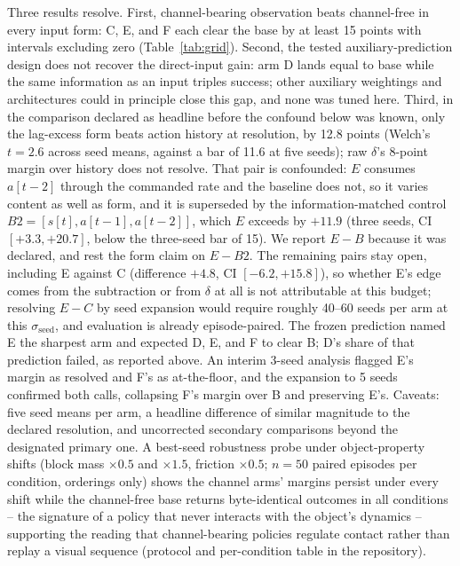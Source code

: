 \documentclass{article}
\begin{document}
Three results resolve. First, channel-bearing observation beats
channel-free in every input form: C, E, and F each clear the base by at
least 15 points with intervals excluding zero (Table~\ref{tab:grid}).
Second, the tested auxiliary-prediction design does not recover the
direct-input gain: arm D lands equal to base while the same information
as an input triples success; other auxiliary weightings and architectures
could in principle close this gap, and none was tuned here. Third, in the
comparison declared as headline before the confound below was known, only
the lag-excess form beats action history at resolution, by 12.8 points
(Welch's $t = 2.6$ across seed means, against a bar of 11.6 at five
seeds); raw $\delta$'s 8-point margin over history does not resolve. That
pair is confounded: $E$ consumes $a[t{-}2]$ through the commanded rate and
the baseline does not, so it varies content as well as form, and it is
superseded by the information-matched control $B2 = [s[t], a[t{-}1],
a[t{-}2]]$, which $E$ exceeds by $+11.9$ (three seeds, CI $[+3.3,
+20.7]$, below the three-seed bar of 15). We report $E{-}B$ because it was
declared, and rest the form claim on $E{-}B2$. The
remaining pairs stay open, including E against C (difference $+4.8$, CI
$[-6.2, +15.8]$), so whether E's edge comes from the subtraction or from
$\delta$ at all is not attributable at this budget;
resolving $E{-}C$ by seed expansion would require roughly 40--60 seeds
per arm at this $\sigma_{\text{seed}}$, and evaluation is already
episode-paired. The frozen prediction named E the sharpest arm and
expected D, E, and F to clear B; D's share of that prediction failed, as
reported above. An interim 3-seed analysis flagged E's margin as resolved
and F's as at-the-floor, and the expansion to 5 seeds confirmed both
calls, collapsing F's margin over B and preserving E's. Caveats: five seed means per arm, a
headline difference of similar magnitude to the declared resolution, and
uncorrected secondary comparisons beyond the designated primary one.
A best-seed robustness probe under object-property shifts (block mass
$\times 0.5$ and $\times 1.5$, friction $\times 0.5$; $n{=}50$ paired
episodes per condition, orderings only) shows the channel arms' margins
persist under every shift while the channel-free base returns
byte-identical outcomes in all conditions -- the signature of a policy
that never interacts with the object's dynamics -- supporting the reading
that channel-bearing policies regulate contact rather than replay a
visual sequence (protocol and per-condition table in the repository).
\end{document}
